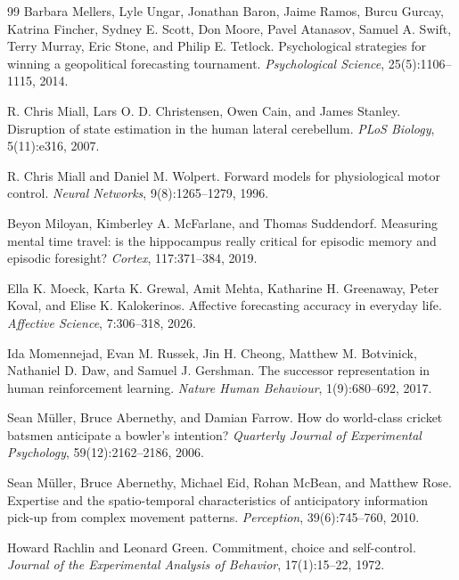 \documentclass[11pt,a4paper]{article}
\theoremstyle{remark}
\begin{document}
\begin{thebibliography}{99}
Barbara Mellers, Lyle Ungar, Jonathan Baron, Jaime Ramos, Burcu Gurcay, Katrina Fincher,
Sydney E. Scott, Don Moore, Pavel Atanasov, Samuel A. Swift, Terry Murray, Eric Stone,
and Philip E. Tetlock.
\newblock Psychological strategies for winning a geopolitical forecasting tournament.
\newblock \emph{Psychological Science}, 25(5):1106--1115, 2014.

R. Chris Miall, Lars O. D. Christensen, Owen Cain, and James Stanley.
\newblock Disruption of state estimation in the human lateral cerebellum.
\newblock \emph{PLoS Biology}, 5(11):e316, 2007.

R. Chris Miall and Daniel M. Wolpert.
\newblock Forward models for physiological motor control.
\newblock \emph{Neural Networks}, 9(8):1265--1279, 1996.

Beyon Miloyan, Kimberley A. McFarlane, and Thomas Suddendorf.
\newblock Measuring mental time travel: is the hippocampus really critical for episodic memory and episodic foresight?
\newblock \emph{Cortex}, 117:371--384, 2019.

Ella K. Moeck, Karta K. Grewal, Amit Mehta, Katharine H. Greenaway, Peter Koval, and Elise K. Kalokerinos.
\newblock Affective forecasting accuracy in everyday life.
\newblock \emph{Affective Science}, 7:306--318, 2026.

Ida Momennejad, Evan M. Russek, Jin H. Cheong, Matthew M. Botvinick, Nathaniel D. Daw, and Samuel J. Gershman.
\newblock The successor representation in human reinforcement learning.
\newblock \emph{Nature Human Behaviour}, 1(9):680--692, 2017.

Sean M\"uller, Bruce Abernethy, and Damian Farrow.
\newblock How do world-class cricket batsmen anticipate a bowler's intention?
\newblock \emph{Quarterly Journal of Experimental Psychology}, 59(12):2162--2186, 2006.

Sean M\"uller, Bruce Abernethy, Michael Eid, Rohan McBean, and Matthew Rose.
\newblock Expertise and the spatio-temporal characteristics of anticipatory information pick-up from complex movement patterns.
\newblock \emph{Perception}, 39(6):745--760, 2010.

Howard Rachlin and Leonard Green.
\newblock Commitment, choice and self-control.
\newblock \emph{Journal of the Experimental Analysis of Behavior}, 17(1):15--22, 1972.


\end{thebibliography}
\end{document}
